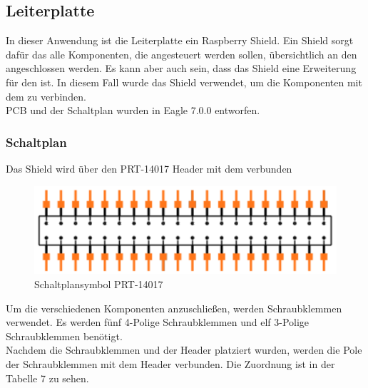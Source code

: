 \subsection{Leiterplatte}
In dieser Anwendung ist die Leiterplatte ein Raspberry Shield. Ein Shield sorgt dafür das alle Komponenten, die angesteuert werden sollen, übersichtlich an den \raspi angeschlossen werden. Es kann aber auch sein, dass das Shield eine Erweiterung für den \raspi ist.
In diesem Fall wurde das Shield verwendet, um die Komponenten mit dem \raspi zu verbinden.\\
\vspace{3mm}
PCB und der Schaltplan wurden in Eagle 7.0.0 entworfen.
\subsubsection{Schaltplan}
Das Shield wird über den PRT-14017\autocite{PRT-14017} Header mit dem \raspi verbunden\\
\vspace{3mm}
\begin{figure}[H]
\centering
\includegraphics[scale=0.7]{image/prt140117.png}
\caption{Schaltplansymbol PRT-14017}
\end{figure}
Um die verschiedenen Komponenten anzuschließen, werden Schraubklemmen verwendet. Es werden fünf 4-Polige Schraubklemmen\autocite{4-polige-Schraubklemme} und elf 3-Polige Schraubklemmen\autocite{W237-103} benötigt.\\
\vspace{3mm}
Nachdem die Schraubklemmen und der Header platziert wurden, werden die Pole der Schraubklemmen mit dem Header verbunden. Die Zuordnung ist in der Tabelle 7 zu sehen. \\
\vspace{3mm}
